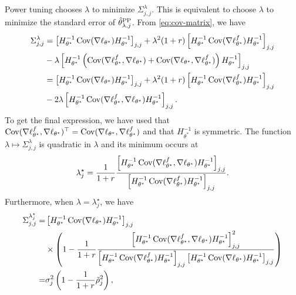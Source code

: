 Power tuning \citep[Section~6]{angelopoulos2024ppi} chooses $\lambda$ to minimize $\Sigma_{j,j}^\lambda$. This is equivalent to choose $\lambda$ to minimize the standard error of $\hat{\theta}^{\mathrm{PP}}_{\lambda,j}$. From \eqref{eq:cov-matrix}, we have
\begin{align*}
    \Sigma^{\lambda}_{j,j} &= \left[H^{-1}_{\theta^\star}\operatorname*{Cov}(\nabla \ell_{\theta^\star})H^{-1}_{\theta^\star}\right]_{j,j}+\lambda^2(1+r) \left[H^{-1}_{\theta^\star}\operatorname*{Cov}(\nabla \ell_{\theta^\star}^f )H^{-1}_{\theta^\star}\right]_{j,j} \\
    &- \lambda \left[H^{-1}_{\theta^\star}\left(\operatorname*{Cov}(\nabla \ell_{\theta^\star}^f,\nabla\ell_{\theta^\star})+\operatorname*{Cov}(\nabla \ell_{\theta^\star},\nabla\ell_{\theta^\star}^f)\right)H^{-1}_{\theta^\star}\right]_{j,j}\\
    &=\left[H^{-1}_{\theta^\star}\operatorname*{Cov}(\nabla \ell_{\theta^\star})H^{-1}_{\theta^\star}\right]_{j,j}
    +\lambda^2 (1+r) \left[H^{-1}_{\theta^\star}\operatorname*{Cov}(\nabla \ell_{\theta^\star}^f)H^{-1}_{\theta^\star}\right]_{j,j}\\
    &- 2\lambda \left[H^{-1}_{\theta^\star}\operatorname*{Cov}(\nabla \ell_{\theta^\star}^f,\nabla\ell_{\theta^\star})H^{-1}_{\theta^\star}\right]_{j,j}.
\end{align*}
To get the final expression, we have used that $\operatorname*{Cov}(\nabla \ell_{\theta^\star}^f,\nabla \ell_{\theta^\star})^\top = \operatorname*{Cov}(\nabla \ell_{\theta^\star},\nabla \ell_{\theta^\star}^f)$ and that $H_{\theta^*}^{-1}$ is symmetric. The function $\lambda \mapsto \Sigma_{j,j}^\lambda$ is quadratic in $\lambda$ and its minimum occurs at
\[
    \lambda^\star_j = \frac{1}{1+r}\frac{\left[H^{-1}_{\theta^\star}\operatorname*{Cov}(\nabla \ell_{\theta^\star}^f,\nabla\ell_{\theta^\star})H^{-1}_{\theta^\star}\right]_{j,j}}{\left[H^{-1}_{\theta^\star}\operatorname*{Cov}(\nabla \ell_{\theta^\star}^f)H^{-1}_{\theta^\star}\right]_{j,j}}. 
\]
Furthermore, when $\lambda = \lambda^\star_{j}$, we have
\begin{align*}
    \Sigma^{\lambda^\star_j}_{j,j} =&  \left[H^{-1}_{\theta^\star}\operatorname*{Cov}(\nabla \ell_{\theta^\star})H^{-1}_{\theta^\star}\right]_{j,j}\\
    &\times \left( 1 - \frac{1}{1+r}\frac{\left[H^{-1}_{\theta^\star}\operatorname*{Cov}(\nabla \ell_{\theta^\star}^f,\nabla\ell_{\theta^\star})H^{-1}_{\theta^\star}\right]_{j,j}^2}{\left[H^{-1}_{\theta^\star}\operatorname*{Cov}(\nabla \ell_{\theta^\star}^f)H^{-1}_{\theta^\star}\right]_{j,j}\left[H^{-1}_{\theta^\star}\operatorname*{Cov}(\nabla \ell_{\theta^\star})H^{-1}_{\theta^\star}\right]_{j,j}}\right) \\
    =&\sigma^2_j\left(1-\frac{1}{1+r}\tilde{\rho}^2_j\right),
\end{align*}
